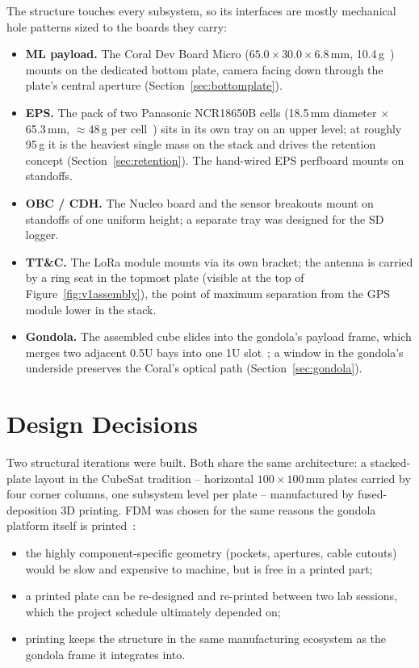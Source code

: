 The structure touches every subsystem, so its interfaces are mostly
mechanical hole patterns sized to the boards they carry:

\begin{itemize}
  \item \textbf{ML payload.} The Coral Dev Board Micro
        ($65.0 \times 30.0 \times 6.8$\,mm, 10.4\,g~\cite{coralds}) mounts on
        the dedicated bottom plate, camera facing down through the plate's
        central aperture (Section~\ref{sec:bottomplate}).
  \item \textbf{EPS.} The pack of two Panasonic NCR18650B cells
        (18.5\,mm diameter $\times$ 65.3\,mm, $\approx$48\,g per
        cell~\cite{ncr}) sits in its own tray on an upper level; at roughly
        95\,g it is the heaviest single mass on the stack and drives the
        retention concept (Section~\ref{sec:retention}). The hand-wired EPS
        perfboard mounts on standoffs.
  \item \textbf{OBC / CDH.} The Nucleo board and the sensor breakouts mount
        on standoffs of one uniform height; a separate tray was designed for
        the SD logger.
  \item \textbf{TT\&C.} The LoRa module mounts via its own bracket; the
        antenna is carried by a ring seat in the topmost plate (visible at
        the top of Figure~\ref{fig:v1assembly}), the point of maximum
        separation from the GPS module lower in the stack.
  \item \textbf{Gondola.} The assembled cube slides into the gondola's
        payload frame, which merges two adjacent 0.5U bays into one 1U
        slot~\cite{kessler}; a window in the gondola's underside preserves
        the Coral's optical path (Section~\ref{sec:gondola}).
\end{itemize}

\section{Design Decisions}

Two structural iterations were built. Both share the same architecture: a
stacked-plate layout in the CubeSat tradition -- horizontal
$100 \times 100$\,mm plates carried by four corner columns, one subsystem
level per plate -- manufactured by fused-deposition 3D printing. FDM was
chosen for the same reasons the gondola platform itself is
printed~\cite{kessler}:

\begin{itemize}
  \item the highly component-specific geometry (pockets, apertures, cable
        cutouts) would be slow and expensive to machine, but is free in a
        printed part;
  \item a printed plate can be re-designed and re-printed between two lab
        sessions, which the project schedule ultimately depended on;
  \item printing keeps the structure in the same manufacturing ecosystem as
        the gondola frame it integrates into.
\end{itemize}

